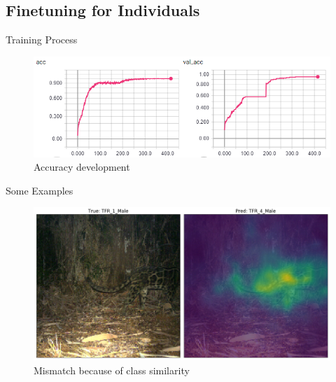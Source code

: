 \documentclass[10pt]{beamer}
\begin{document}
\subsection{Finetuning for Individuals}

\begin{frame}{Training Process}
	\centering
	\begin{figure}
		\includegraphics[width=.9\columnwidth,height=\textheight,keepaspectratio]{images/Acc_finetune_leo_both.png}
		\caption{Accuracy development}
	\end{figure}
\end{frame}


\begin{frame}{Some Examples}
	\centering
	\begin{figure}
		\includegraphics[width=\columnwidth]{images/finetune_Attention.png}
		\caption{Mismatch because of class similarity}
	\end{figure}
\end{frame}

\end{document}

